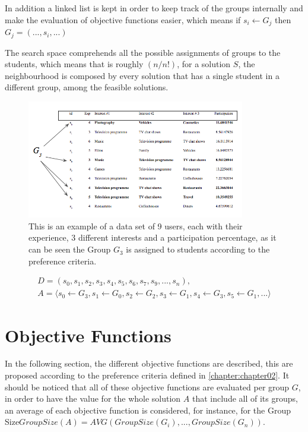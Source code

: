 In addition a linked list is kept in order to keep track of the groups internally and make the evaluation of objective functions easier, which means if $s_i \leftarrow G_j$ then $G_j = (...,s_i,...)$

The search space comprehends all the possible assignments of groups to the students, which means that is roughly $(n/n!)$, for a solution $S$, the neighbourhood is composed by every solution that has a single student in a different group, among the feasible solutions.

\begin{figure}
    \caption{This is an example of a data set of 9 users, each with their experience, 3 different interests and a participation percentage, as it can be seen the Group $G_3$ is assigned to students according to the preference criteria.}
    \label{dataset_eg}
    \includegraphics[width=0.85\textwidth]{images/dataset_eg.png}
\end{figure}

\begin{equation*}
  \label{eq:students_groups}
  \begin{gathered}
        D = (s_0,s_1,s_2,s_3,s_4,s_5,s_6,s_7,s_9,...,s_n),\\
        A = \langle s_0 \leftarrow G_3, s_1 \leftarrow G_0, s_2 \leftarrow G_2,     s_3 \leftarrow G_1, s_4 \leftarrow G_3, s_5 \leftarrow G_1,...  \rangle
  \end{gathered}
\end{equation*}

\section{Objective Functions}

In the following section, the different objective functions are described, this are proposed according to the preference criteria defined in \ref{chapter:chapter02}. It should be noticed that all of these objective functions are evaluated per group $G$, in order to have the value for the whole solution $A$ that include all of its groups, an average of each objective function is considered, for instance, for the Group Size$GroupSize(A) = AVG(GroupSize(G_i),...,GroupSize(G_n))$.


